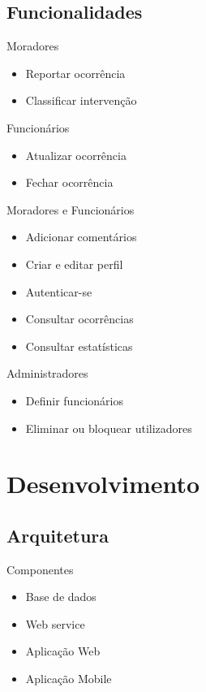 \documentclass[portuges]{beamer}
\begin{document}
\subsection{Funcionalidades}

\begin{frame}{Moradores}
 \begin{itemize}
 \item Reportar ocorrência
 \item Classificar intervenção
 \end{itemize}
\end{frame}

\begin{frame}{Funcionários}
 \begin{itemize}
 \item Atualizar ocorrência
 \item Fechar ocorrência
 \end{itemize}
\end{frame}

\begin{frame}{Moradores e Funcionários}
 \begin{itemize}
 \item Adicionar comentários	
 \item Criar e editar perfil
 \item Autenticar-se
 \item Consultar ocorrências
 \item Consultar estatísticas
 \end{itemize}
\end{frame}

\begin{frame}{Administradores}
 \begin{itemize}
 \item Definir funcionários
 \item Eliminar ou bloquear utilizadores
 \end{itemize}
\end{frame}

\section{Desenvolvimento}

\subsection{Arquitetura}

\begin{frame}{Componentes}
 \begin{itemize}
 \item Base de dados
 \item Web service
 \item Aplicação Web
 \item Aplicação Mobile 
 \end{itemize}
\end{frame}
\end{document}
